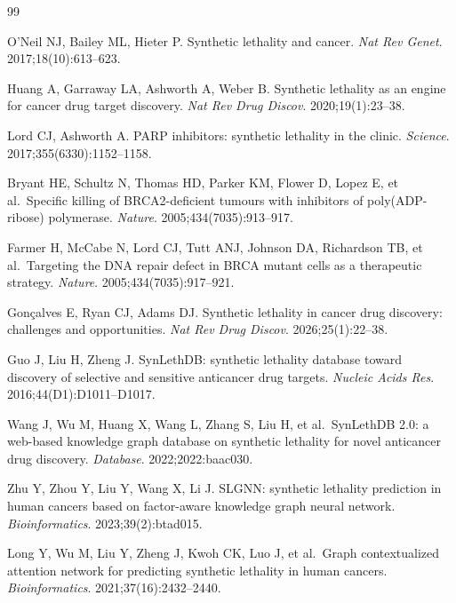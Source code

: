 \documentclass[11pt,a4paper]{article}
\begin{document}
\begin{thebibliography}{99}

 O'Neil NJ, Bailey ML, Hieter P. Synthetic lethality and cancer. \textit{Nat Rev Genet}. 2017;18(10):613--623.

 Huang A, Garraway LA, Ashworth A, Weber B. Synthetic lethality as an engine for cancer drug target discovery. \textit{Nat Rev Drug Discov}. 2020;19(1):23--38.

 Lord CJ, Ashworth A. PARP inhibitors: synthetic lethality in the clinic. \textit{Science}. 2017;355(6330):1152--1158.

 Bryant HE, Schultz N, Thomas HD, Parker KM, Flower D, Lopez E, et al.\ Specific killing of BRCA2-deficient tumours with inhibitors of poly(ADP-ribose) polymerase. \textit{Nature}. 2005;434(7035):913--917.

 Farmer H, McCabe N, Lord CJ, Tutt ANJ, Johnson DA, Richardson TB, et al.\ Targeting the DNA repair defect in BRCA mutant cells as a therapeutic strategy. \textit{Nature}. 2005;434(7035):917--921.

 Gonçalves E, Ryan CJ, Adams DJ. Synthetic lethality in cancer drug discovery: challenges and opportunities. \textit{Nat Rev Drug Discov}. 2026;25(1):22--38.

 Guo J, Liu H, Zheng J. SynLethDB: synthetic lethality database toward discovery of selective and sensitive anticancer drug targets. \textit{Nucleic Acids Res}. 2016;44(D1):D1011--D1017.

 Wang J, Wu M, Huang X, Wang L, Zhang S, Liu H, et al.\ SynLethDB 2.0: a web-based knowledge graph database on synthetic lethality for novel anticancer drug discovery. \textit{Database}. 2022;2022:baac030.

 Zhu Y, Zhou Y, Liu Y, Wang X, Li J. SLGNN: synthetic lethality prediction in human cancers based on factor-aware knowledge graph neural network. \textit{Bioinformatics}. 2023;39(2):btad015.

 Long Y, Wu M, Liu Y, Zheng J, Kwoh CK, Luo J, et al.\ Graph contextualized attention network for predicting synthetic lethality in human cancers. \textit{Bioinformatics}. 2021;37(16):2432--2440.


\end{thebibliography}
\end{document}
